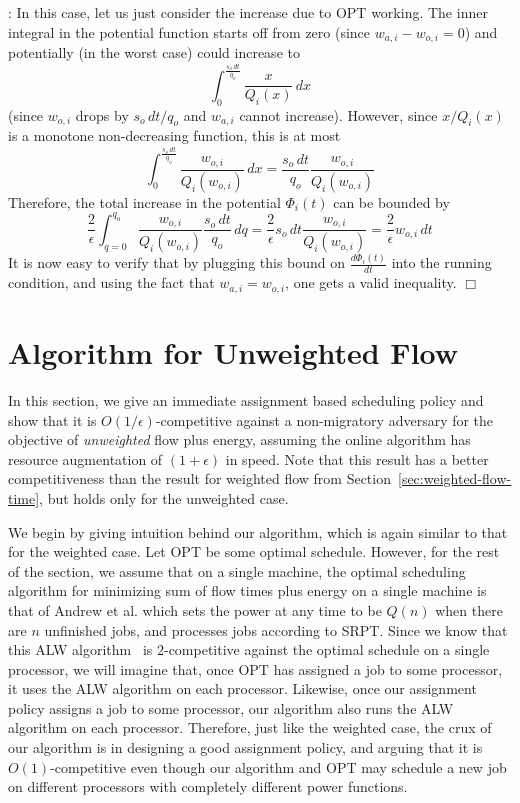 \documentclass[11pt]{article}
\newenvironment{proof}{\vspace{-0.15in}\noindent{\bf Proof:}}{\hspace*{\fill}$\Box$\par}
\newcommand{\opt}{\textrm{\sc OPT}\xspace}
\newcommand{\alw}{{\sf ALW}\xspace}
\newcommand{\const}{\frac{2}{\epsilon}}
\newcommand{\dphidt}{{\frac{d \Phi_i(t)}{dt}}}
\begin{document}
\begin{proof}
\medskip {}: In this case,
let us just consider the increase due to \opt working. The inner
integral in the potential function starts off from zero (since $w_{a,i}
- w_{o,i} = 0$) and potentially (in the worst case) could increase to
\[ \int_{0}^{ \frac{s_o
    \,dt}{q_o}} \frac{x}{Q_i(x)} \,dx
\] (since $w_{o,i}$ drops by $s_o \,dt/q_o$ and $w_{a,i}$ cannot
increase). However, since $x/Q_i(x)$ is a monotone non-decreasing
function, this is at most
\[  \int_{0}^{ \frac{s_o \,dt}{q_o}} \frac{w_{o,i}}{Q_i(w_{o,i})} \,dx =
\frac{s_o \,dt}{q_o} \frac{w_{o,i}}{Q_i(w_{o,i})}
\]
Therefore, the total increase in the potential $\Phi_i(t)$ can be
bounded by
\[ \const \int_{q = 0}^{q_o} \frac{w_{o,i}}{Q_i(w_{o,i})}
\frac{s_o \,dt}{q_o} \,dq = \const s_o \,dt \frac{w_{o,i}}{Q_i(w_{o,i})} =
\const w_{o,i} \,dt
\]
It is now easy to verify that by plugging this bound on $\dphidt$
into the
running condition,
and using the fact that $w_{a,i} = w_{o,i}$,
one gets a valid inequality.
\end{proof}


\section{Algorithm for Unweighted Flow}
\label{dsec:unweighted-flow}

In this section, we give an immediate assignment based scheduling policy
and show that it is $O(1/\epsilon)$-competitive against a non-migratory
adversary for the objective of \emph{unweighted} flow plus energy,
assuming the online algorithm has resource augmentation of
$(1+\epsilon)$ in speed. Note that this result has a better
competitiveness than the result for weighted flow from
Section~\ref{sec:weighted-flow-time}, but holds only for the unweighted case.

We begin by giving intuition behind our algorithm, which is again
similar to that for the weighted case. Let \opt be some optimal
schedule. 
However, for the rest of the section, we assume that on a single machine, the optimal scheduling algorithm for minimizing sum of flow times plus energy on a single machine
is that of Andrew et al.\cite{Lachlan2009} which sets the power at any time to be $Q(n)$ when there are $n$ unfinished jobs, and processes jobs according to SRPT.
Since we know that this \alw algorithm~\cite{Lachlan2009} is
$2$-competitive against the optimal schedule on a single processor, we
will imagine that, once \opt has assigned a job to some processor, it
uses the \alw algorithm on each processor. Likewise, once our assignment
policy assigns a job to some processor, our algorithm also runs the \alw algorithm on each processor.
Therefore, just like the weighted case, the crux of our algorithm is in designing a good assignment policy,
and arguing that it is $O(1)$-competitive even though our algorithm and
\opt may schedule a new job on different processors with completely
different power functions.
\end{document}
